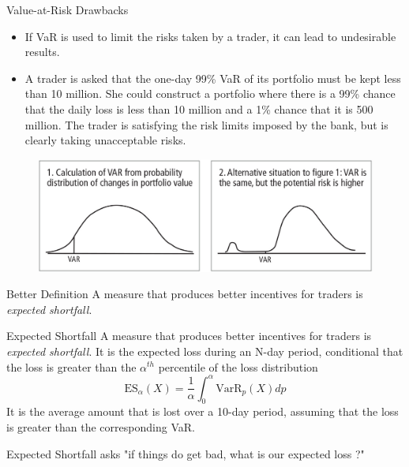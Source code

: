 \documentclass{beamer}
\begin{document}
\begin{frame}{Value-at-Risk Drawbacks}
  \begin{itemize}
  \item If VaR is used to limit the risks taken by a trader, it can lead to undesirable results.
  \item A trader is asked that the one-day 99\% VaR of its portfolio must be kept less than 10 million. She could construct a portfolio where there is a 99\% chance that the daily loss is less than 10 million and a 1\% chance that it is 500 million. The trader is satisfying the risk limits imposed by the bank, but is clearly taking unacceptable risks.
  \end{itemize}
  \begin{figure}[h]
    \begin{center}
      \includegraphics[width=0.7\linewidth]{var_badvar}
    \end{center}
  \end{figure}
\end{frame}

\begin{frame}{Better Definition}
  A measure that produces better incentives for traders is \emph{expected shortfall}.
  \begin{block}{Expected Shortfall}
    A measure that produces better incentives for traders is \emph{expected shortfall}. It is the expected loss during an N-day period, conditional that the loss is greater than the $\alpha^{th}$ percentile of the loss distribution
    \begin{equation*}
      \textrm{ES}_{\alpha}(X) = \frac{1}{\alpha}\int_0^\alpha \textrm{VarR}_p(X) dp
    \end{equation*}
It is the average amount that is lost over a 10-day period, assuming that the loss is greater than the corresponding VaR.

Expected Shortfall asks "if things do get bad, what is our expected loss ?"
\end{block}
\end{frame}
\end{document}
